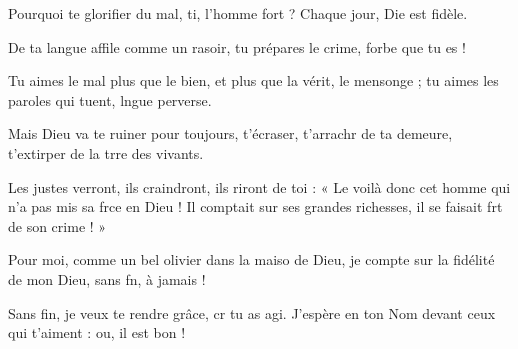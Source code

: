 \item Pourquoi te glorifier du mal, ti, l’homme fort ?\psstar{} Chaque jour, Die est fidèle.
\item De ta langue affile comme un rasoir,\psstar{} tu prépares le crime, forbe que tu es !
\item Tu aimes le mal plus que le bien,\pscross{} et plus que la vérit, le mensonge ;\psstar{} tu aimes les paroles qui tuent, lngue perverse.
\item Mais Dieu va te ruiner pour toujours,\pscross{} t’écraser, t’arrachr de ta demeure,\psstar{} t’extirper de la trre des vivants.
\item Les justes verront, ils craindront, ils riront de toi :\pscross{} « Le voilà donc cet homme qui n’a pas mis sa frce en Dieu !\psstar{} Il comptait sur ses grandes richesses, il se faisait frt de son crime ! »
\item Pour moi, comme un bel olivier dans la maiso de Dieu,\psstar{} je compte sur la fidélité de mon Dieu, sans fn, à jamais !
\item Sans fin, je veux te rendre grâce, cr tu as agi.\psstar{} J’espère en ton Nom devant ceux qui t’aiment : ou, il est bon !